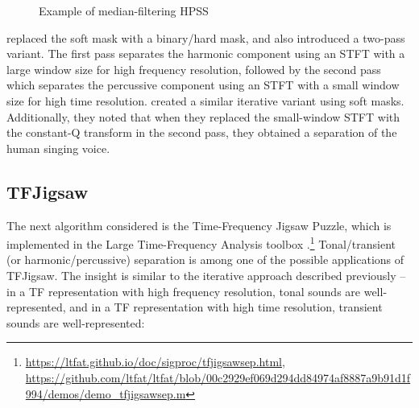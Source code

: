 \documentclass[letter,12pt]{article}
\begin{document}
\begin{figure}[ht]
	\centering
	\caption{Example of median-filtering HPSS}
	\label{fig:fitz1}
\end{figure}

\citet{driedger} replaced the soft mask with a binary/hard mask, and also introduced a two-pass variant. The first pass separates the harmonic component using an STFT with a large window size for high frequency resolution, followed by the second pass which separates the percussive component using an STFT with a small window size for high time resolution. \citet{fitzgerald2} created a similar iterative variant using soft masks. Additionally, they noted that when they replaced the small-window STFT with the constant-Q transform in the second pass, they obtained a separation of the human singing voice.

\subsection{TFJigsaw}

The next algorithm considered is the Time-Frequency Jigsaw Puzzle\cite{tfjigsaw}, which is implemented in the Large Time-Frequency Analysis toolbox \cite{ltfat}.\footnote{\url{https://ltfat.github.io/doc/sigproc/tfjigsawsep.html}, \url{https://github.com/ltfat/ltfat/blob/00c2929ef069d294dd84974af8887a9b91d1f994/demos/demo_tfjigsawsep.m}} Tonal/transient (or harmonic/percussive) separation is among one of the possible applications of TFJigsaw. The insight is similar to the iterative approach described previously -- in a TF representation with high frequency resolution, tonal sounds are well-represented, and in a TF representation with high time resolution, transient sounds are well-represented:
\end{document}
